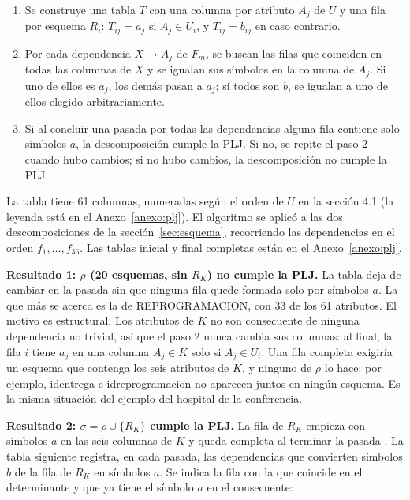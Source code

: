 \documentclass[11pt,a4paper]{article}
\newcommand{\ubrk}{\textunderscore\allowbreak}
\newcommand{\campo}[1]{\textnormal{\ttfamily\let\_\ubrk #1}}
\begin{document}
\begin{enumerate}
\item Se construye una tabla $T$ con una columna por atributo $A_j$ de $U$ y una fila por esquema $R_i$: $T_{ij} = a_j$ si $A_j \in U_i$, y $T_{ij} = b_{ij}$ en caso contrario.
\item Por cada dependencia $X \rightarrow A_j$ de $F_m$, se buscan las filas que coinciden en todas las columnas de $X$ y se igualan sus símbolos en la columna de $A_j$. Si uno de ellos es $a_j$, los demás pasan a $a_j$; si todos son $b$, se igualan a uno de ellos elegido arbitrariamente.
\item Si al concluir una pasada por todas las dependencias alguna fila contiene solo símbolos $a$, la descomposición cumple la PLJ. Si no, se repite el paso 2 cuando hubo cambios; si no hubo cambios, la descomposición no cumple la PLJ.
\end{enumerate}

La tabla tiene 61 columnas, numeradas según el orden de $U$ en la sección 4.1 (la leyenda está en el Anexo~\ref{anexo:plj}). El algoritmo se aplicó a las dos descomposiciones de la sección~\ref{sec:esquema}, recorriendo las dependencias en el orden $f_1, \dots, f_{36}$. Las tablas inicial y final completas están en el Anexo~\ref{anexo:plj}.

\textbf{Resultado 1: $\rho$ (20 esquemas, sin $R_K$) no cumple la PLJ.} La tabla deja de cambiar en la pasada \numpasadassinRK{} sin que ninguna fila quede formada solo por símbolos $a$. La que más se acerca es la de REPROGRAMACION, con 33 de los 61 atributos. El motivo es estructural. Los atributos de $K$ no son consecuente de ninguna dependencia no trivial, así que el paso 2 nunca cambia sus columnas: al final, la fila $i$ tiene $a_j$ en una columna $A_j \in K$ solo si $A_j \in U_i$. Una fila completa exigiría un esquema que contenga los seis atributos de $K$, y ninguno de $\rho$ lo hace: por ejemplo, \campo{id\_entrega} e \campo{id\_reprogramacion} no aparecen juntos en ningún esquema. Es la misma situación del ejemplo del hospital de la conferencia.

\textbf{Resultado 2: $\sigma = \rho \cup \{R_K\}$ cumple la PLJ.} La fila de $R_K$ empieza con símbolos $a$ en las seis columnas de $K$ y queda completa al terminar la pasada \numpasadas. La tabla siguiente registra, en cada pasada, las dependencias que convierten símbolos $b$ de la fila de $R_K$ en símbolos $a$. Se indica la fila con la que coincide en el determinante y que ya tiene el símbolo $a$ en el consecuente:
\end{document}
